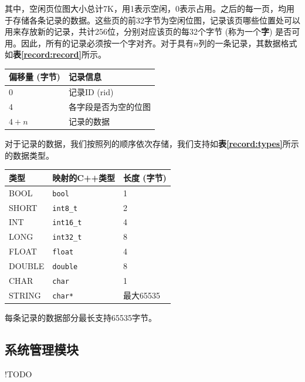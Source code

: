 \documentclass[11pt, a4paper]{article}
\makeatletter
\newcommand\tcaption{\def\@captype{table}\caption}
\newcommand{\tref}[1]{\textbf{表\ref{#1}}}
\makeatother
\begin{document}
其中，空闲页位图大小总计7K，用1表示空闲，0表示占用。之后的每一页，均用于存储各条记录的数据。这些页的前32字节为空闲位图，记录该页哪些位置处可以用来存放新的记录，共计256位，分别对应该页的每32个字节 (称为一个\textbf{字}) 是否可用。因此，所有的记录必须按一个字对齐。对于具有$n$列的一条记录，其数据格式如\tref{record:record}所示。

\begin{center}
    \tcaption{记录数据格式}\label{record:record}
    \begin{tabular}{ll}
        \toprule
        偏移量 (字节) & 记录信息 \\
        \midrule
        0 & 记录ID (rid)  \\
        4 & 各字段是否为空的位图 \\
        $4+n$ & 记录的数据 \\
        \bottomrule
    \end{tabular}
\end{center}

对于记录的数据，我们按照列的顺序依次存储，我们支持如\tref{record:types}所示的数据类型。

\begin{center}
    \tcaption{支持的数据类型}\label{record:types}
    \begin{tabular}{lll}
        \toprule
        类型 & 映射的C++类型 & 长度 (字节) \\
        \midrule
        BOOL & \texttt{bool} & 1 \\
        SHORT & \texttt{int8\_t} & 2 \\
        INT & \texttt{int16\_t} & 4 \\
        LONG & \texttt{int32\_t} & 8 \\
        FLOAT & \texttt{float} & 4 \\
        DOUBLE & \texttt{double} & 8 \\
        CHAR & \texttt{char} & 1 \\
        STRING & \texttt{char*} & 最大65535 \\
        \bottomrule
    \end{tabular}
\end{center}

每条记录的数据部分最长支持65535字节。

\subsection{系统管理模块}

!TODO
\end{document}
